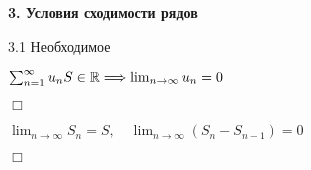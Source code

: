 \documentclass[12pt]{article}
\begin{document}
    \mediumvspace

    \textbf{3. Условия сходимости рядов}

    3.1 Необходимое

    \begin{MyTheorem}
        \Ths $\sum_{n = 1}^\infty u_n S \in \mathbb{R} \Longrightarrow \lim_{n \to \infty} u_n = 0$
    \end{MyTheorem}

    \begin{tcolorbox}
        $\Box$

        $\lim_{n \to \infty} S_n = S, \quad \lim_{n\to\infty} (S_n - S_{n - 1}) = 0$

        $\Box$
    \end{tcolorbox}
\end{document}
